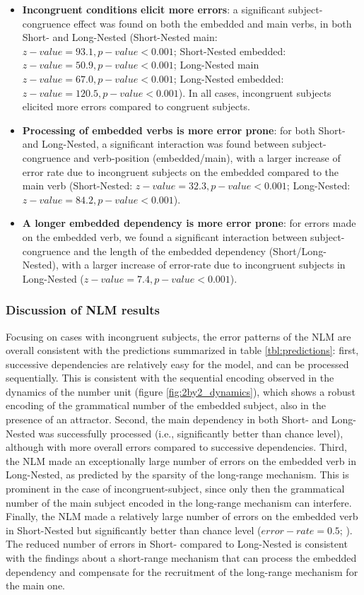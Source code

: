 \begin{itemize}
    \item \textbf{Incongruent conditions elicit more errors}: a significant subject-congruence effect was found on both the embedded and main verbs, in both Short- and Long-Nested (Short-Nested main: $z-value=93.1, p-value<0.001$; Short-Nested embedded: $z-value=50.9, p-value<0.001$; Long-Nested main $z-value=67.0, p-value<0.001$; Long-Nested embedded: $z-value=120.5, p-value<0.001$). In all cases, incongruent subjects elicited more errors compared to congruent subjects.
    \item \textbf{Processing of embedded verbs is more error prone}: for both Short- and Long-Nested, a significant interaction was found between subject-congruence and verb-position (embedded/main), with a larger increase of error rate due to incongruent subjects on the embedded compared to the main verb (Short-Nested: $z-value=32.3, p-value<0.001$; Long-Nested: $z-value=84.2, p-value<0.001$).
    \item \textbf{A longer embedded dependency is more error prone}: for errors made on the embedded verb, we found a significant interaction between subject-congruence and the length of the embedded dependency (Short/Long-Nested), with a larger increase of error-rate due to incongruent subjects in Long-Nested ($z-value=7.4, p-value<0.001$).
\end{itemize}
 
\vspace{10pt}

\subsubsection{Discussion of NLM results}
Focusing on cases with incongruent subjects, the error patterns of the NLM are overall consistent with the predictions summarized in table \ref{tbl:predictions}: first, successive dependencies are relatively easy for the model, and can be processed sequentially. This is consistent with the sequential encoding observed in the dynamics of the number unit (figure \ref{fig:2by2_dynamics}), which shows a robust encoding of the grammatical number of the embedded subject, also in the presence of an attractor. Second, the main dependency in both Short- and Long-Nested was successfully processed (i.e., significantly better than chance level), although with more overall errors compared to successive dependencies. Third, the NLM made an exceptionally large number of errors on the embedded verb in Long-Nested, as predicted by the sparsity of the long-range mechanism. This is prominent in the case of incongruent-subject, since only then the grammatical number of the main subject encoded in the long-range mechanism can interfere. Finally, the NLM made a relatively large number of errors on the embedded verb in Short-Nested but significantly better than chance level ($error-rate = 0.5$; ). The reduced number of errors in Short- compared to Long-Nested is consistent with the findings about a short-range mechanism that can process the embedded dependency and compensate for the recruitment of the long-range mechanism for the main one. 

